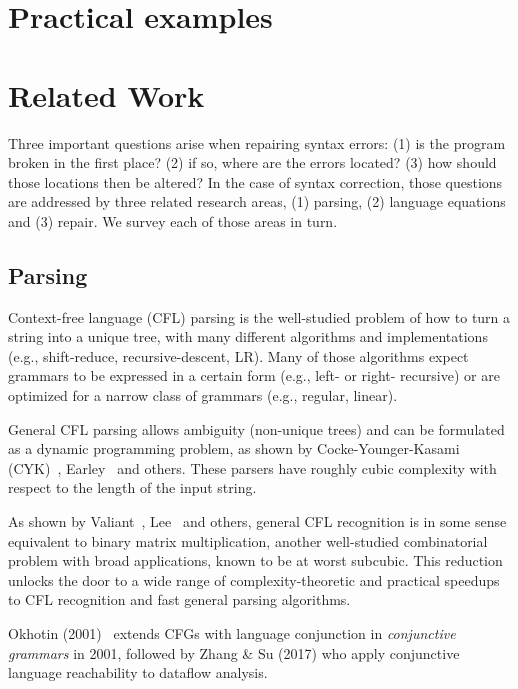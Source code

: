 \documentclass[sigplan,review,anonymous,acmsmall]{acmart}\settopmatter{printfolios=false,printccs=false,printacmref=false}
\begin{document}
\section{Practical examples}\label{sec:examples}



\section{Related Work}\label{sec:related}

Three important questions arise when repairing syntax errors: (1) is the program broken in the first place? (2) if so, where are the errors located? (3) how should those locations then be altered? In the case of syntax correction, those questions are addressed by three related research areas, (1) parsing, (2) language equations and (3) repair. We survey each of those areas in turn.

\subsection{Parsing}

Context-free language (CFL) parsing is the well-studied problem of how to turn a string into a unique tree, with many different algorithms and implementations (e.g., shift-reduce, recursive-descent, LR). Many of those algorithms expect grammars to be expressed in a certain form (e.g., left- or right- recursive) or are optimized for a narrow class of grammars (e.g., regular, linear).

General CFL parsing allows ambiguity (non-unique trees) and can be formulated as a dynamic programming problem, as shown by Cocke-Younger-Kasami (CYK)~\cite{sakai1961syntax}, Earley~\cite{earley1970efficient} and others. These parsers have roughly cubic complexity with respect to the length of the input string.

As shown by Valiant~\cite{valiant1975general}, Lee~\cite{lee2002fast} and others, general CFL recognition is in some sense equivalent to binary matrix multiplication, another well-studied combinatorial problem with broad applications, known to be at worst subcubic. This reduction unlocks the door to a wide range of complexity-theoretic and practical speedups to CFL recognition and fast general parsing algorithms.

Okhotin (2001)~\cite{okhotin2001conjunctive} extends CFGs with language conjunction in \textit{conjunctive grammars} in 2001, followed by Zhang \& Su (2017) who apply conjunctive language reachability to dataflow analysis.
\end{document}
